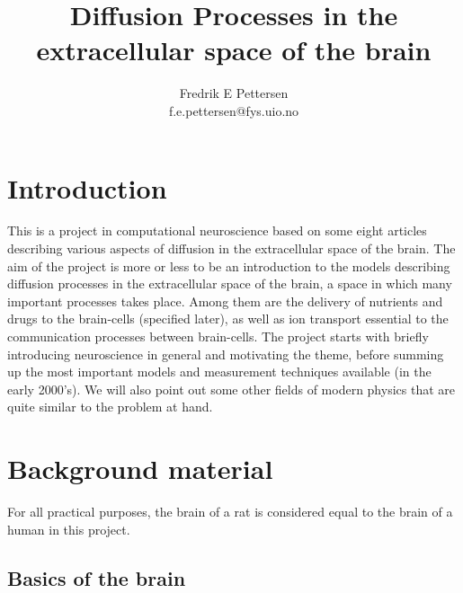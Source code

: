 \documentclass[a4paper,english, 12pt, twoside]{article}
\title{Diffusion Processes in the extracellular space of the brain}
\author{Fredrik E Pettersen\\ f.e.pettersen@fys.uio.no}
\begin{document}
\maketitle

% 
\tableofcontents
\newpage
\section{Introduction}
This is a project in computational neuroscience based on some eight articles describing various aspects of diffusion in the extracellular space of the brain. 
The aim of the project is more or less to be an introduction to the models describing diffusion processes in the extracellular space of the brain, a space in which many important processes takes place. 
Among them are the delivery of nutrients and drugs to the brain-cells (specified later), as well as ion transport essential to the communication processes between brain-cells. 
The project starts with briefly introducing neuroscience in general and motivating the theme, before summing up the most important models and measurement techniques available (in the early 2000's). 
We will also point out some other fields of modern physics that are quite similar to the problem at hand.

\section{Background material}
For all practical purposes, the brain of a rat is considered equal to the brain of a human in this project.
\subsection{Basics of the brain}
\end{document}
